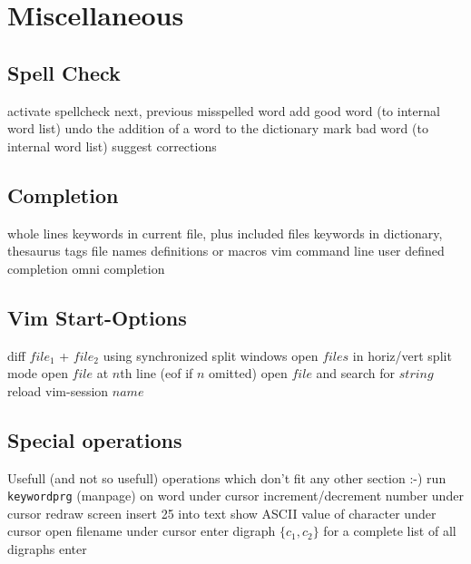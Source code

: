 \section{Miscellaneous}	{}

\subsection{Spell Check}	{}
	{activate spellcheck}
\cmdS{]s\ [s }	{next, previous misspelled word}
	{add good word (to internal word list)}
	{undo the addition of a word to the dictionary}
	{mark bad word (to internal word list)}
	{suggest corrections}

\subsection{Completion}	{}
	{whole lines}
	{keywords in current file, plus included files}
	{keywords in dictionary, thesaurus}
\cmdS{\ctrl{}X\ctrl{}]}	{tags}
	{file names}
	{definitions or macros}
	{vim command line}
	{user defined completion}
	{omni completion}

\subsection{Vim Start-Options}	{}
	{diff $file_1$ + $file_2$ using synchronized split windows}
	{open $files$ in horiz/vert split mode}
	{open $file$ at $n$th line (eof if $n$ omitted)}
	{open $file$ and search for $string$ }
	{reload vim-session $name$}

\subsection{Special operations}	{Usefull (and not so usefull) operations which don't fit any other section :-)}
	{run {\tt keywordprg} (manpage) on word under cursor}
	{increment/decrement number under cursor}
	{redraw screen}
	{insert 25 into text}
	{show A{\smallrm SCII} value of character under cursor}
	{open filename under cursor}
	{enter digraph $\{c_1,c_2\}$}
	{for a complete list of all digraphs enter}

